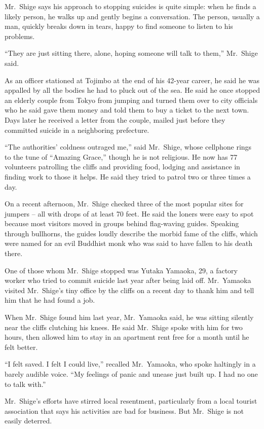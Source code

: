 ﻿\documentclass[12pt]{article}
\begin{document}
Mr.~Shige says his approach to stopping suicides is quite simple: when he finds a likely person, he
walks up and gently begins a conversation. The person, usually a man, quickly breaks down in tears,
happy to find someone to listen to his problems.

``They are just sitting there, alone, hoping someone will talk to them,'' Mr.~Shige said.

As an officer stationed at Tojimbo at the end of his 42-year career, he said he was appalled by all
the bodies he had to pluck out of the sea. He said he once stopped an elderly couple from Tokyo from
jumping and turned them over to city officials who he said gave them money and told them to buy a
ticket to the next town. Days later he received a letter from the couple, mailed just before they
committed suicide in a neighboring prefecture.

``The authorities' coldness outraged me,'' said Mr.~Shige, whose cellphone rings to the tune of
``Amazing Grace,'' though he is not religious. He now has 77 volunteers patrolling the cliffs and
providing food, lodging and assistance in finding work to those it helps. He said they tried to
patrol two or three times a day.

On a recent afternoon, Mr.~Shige checked three of the most popular sites for jumpers -- all with
drops of at least 70 feet. He said the loners were easy to spot because most visitors moved in
groups behind flag-waving guides. Speaking through bullhorns, the guides loudly describe the morbid
fame of the cliffs, which were named for an evil Buddhist monk who was said to have fallen to his
death there.

One of those whom Mr.~Shige stopped was Yutaka Yamaoka, 29, a factory worker who tried to commit
suicide last year after being laid off. Mr.~Yamaoka visited Mr.~Shige's tiny office by the cliffs on
a recent day to thank him and tell him that he had found a job.

When Mr.~Shige found him last year, Mr.~Yamaoka said, he was sitting silently near the cliffs
clutching his knees. He said Mr.~Shige spoke with him for two hours, then allowed him to stay in an
apartment rent free for a month until he felt better.

``I felt saved. I felt I could live,'' recalled Mr.~Yamaoka, who spoke haltingly in a barely audible
voice. ``My feelings of panic and unease just built up. I had no one to talk with.''

Mr.~Shige's efforts have stirred local resentment, particularly from a local tourist association
that says his activities are bad for business. But Mr.~Shige is not easily deterred.
\end{document}
